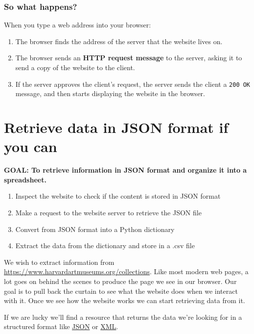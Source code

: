 \documentclass[
]{book}
\providecommand{\tightlist}{%
  \setlength{\itemsep}{0pt}\setlength{\parskip}{0pt}}
\begin{document}
\hypertarget{so-what-happens}{%
\subsubsection{So what happens?}\label{so-what-happens}}

When you type a web address into your browser:

\begin{enumerate}
\def\labelenumi{\arabic{enumi}.}
\tightlist
\item
  The browser finds the address of the server that the website lives on.
\item
  The browser sends an \textbf{HTTP request message} to the server, asking it to send a copy of the website to the client.
\item
  If the server approves the client's request, the server sends the client a \texttt{200\ OK} message, and then starts displaying the website in the browser.
\end{enumerate}

\hypertarget{retrieve-data-in-json-format-if-you-can}{%
\section{Retrieve data in JSON format if you can}\label{retrieve-data-in-json-format-if-you-can}}

\textbf{GOAL: To retrieve information in JSON format and organize it into a spreadsheet.}

\begin{enumerate}
\def\labelenumi{\arabic{enumi}.}
\tightlist
\item
  Inspect the website to check if the content is stored in JSON format
\item
  Make a request to the website server to retrieve the JSON file
\item
  Convert from JSON format into a Python dictionary
\item
  Extract the data from the dictionary and store in a .csv file
\end{enumerate}

We wish to extract information from \url{https://www.harvardartmuseums.org/collections}. Like most modern web pages, a lot goes on behind the scenes to produce the page we see in our browser. Our goal is to pull back the curtain to see what the website does when we interact with it. Once we see how the website works we can start retrieving data from it.

If we are lucky we'll find a resource that returns the data we're looking for in a structured format like \href{https://json.org/}{JSON} or \href{https://en.wikipedia.org/wiki/XML}{XML}.
\end{document}
